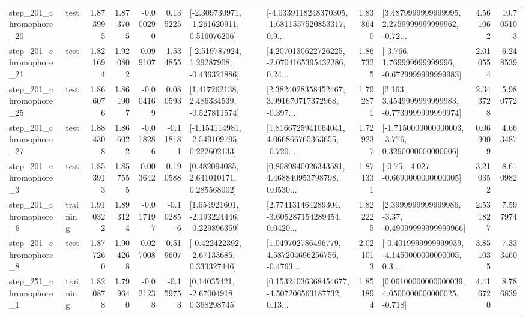 \begin{tabular}{llrrrrllrlrr}
  step\_201\_chromophore\_20 &      test &      1.873995 &    1.873705 &     -0.000290 &  0.135225 &   [-2.309730971, -1.261620911, 0.516076206] &  [-4.0339118248370305, -1.6811557520853317, 0.9... &       1.838640 &  [3.4879999999999995, 2.2759999999999962, -0.72... &            4.561062 &         10.705103 \\
  step\_201\_chromophore\_21 &      test &      1.821694 &    1.920802 &      0.099107 &  1.534855 &    [-2.519787924, 1.29287908, -0.436321886] &  [4.2070130622726225, -2.0704165395432286, 0.24... &       1.867325 &   [-3.766, 1.769999999999996, -0.6729999999999983] &            2.010554 &          6.248539 \\
  step\_201\_chromophore\_25 &      test &      1.866076 &    1.861907 &     -0.004169 &  0.080593 &    [1.417262138, 2.486334539, -0.527811574] &  [2.3824028358452467, 3.991670717372968, -0.397... &       1.792871 &   [2.163, 3.4549999999999983, -0.7739999999999974] &            2.343728 &          5.980772 \\
  step\_201\_chromophore\_27 &      test &      1.884308 &    1.866022 &     -0.018286 & -0.118181 &   [-1.154114981, -2.549109795, 0.222602133] &  [1.8166725941064041, 4.066866765363655, -0.720... &       1.729237 &  [-1.7150000000000003, -3.776, 0.3290000000000006] &            0.069009 &          4.663487 \\
   step\_201\_chromophore\_3 &      test &      1.853913 &    1.857555 &      0.003642 &  0.190588 &     [0.482094085, 2.641010171, 0.285568002] &  [0.8089840026343581, 4.468840953798798, 0.0530... &       1.871331 &               [-0.75, -4.027, -0.6690000000000005] &            3.210352 &          8.610982 \\
   step\_201\_chromophore\_6 &  training &      1.910322 &    1.893124 &     -0.017197 & -0.102856 &   [1.654921601, -2.193224446, -0.229896359] &  [2.774131464289304, -3.605287154289454, 0.0420... &       1.822225 &  [2.3999999999999986, -3.37, -0.49099999999999966] &            2.531827 &          7.597974 \\
   step\_201\_chromophore\_8 &      test &      1.877260 &    1.904268 &      0.027008 &  0.519607 &    [-0.422422392, -2.67133685, 0.333327446] &  [1.049702786496779, 4.587204696256756, -0.4763... &       2.021013 &  [-0.4019999999999939, -4.1450000000000005, 0.3... &            3.851035 &          7.333460 \\
   step\_251\_chromophore\_1 &  training &      1.820878 &    1.799640 &     -0.021238 & -0.159753 &      [0.14035421, -2.67004918, 0.368298745] &  [0.15324036368454677, -4.507206563187732, 0.13... &       1.851894 &  [0.06100000000000039, 4.0500000000000025, -0.718] &            4.416720 &          8.786839 \\

\end{tabular}

